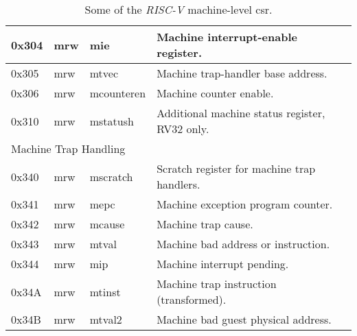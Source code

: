 \begin{table}[!ht]
\begin{tabular}{|llll|}
  \multicolumn{1}{|l|}{0x304}           & \multicolumn{1}{l|}{\acrshort{mrw}}                & \multicolumn{1}{l|}{mie}           & Machine interrupt-enable register.             \\ \hline
  \multicolumn{1}{|l|}{0x305}           & \multicolumn{1}{l|}{\acrshort{mrw}}                & \multicolumn{1}{l|}{mtvec}         & Machine trap-handler base address.             \\ \hline
  \multicolumn{1}{|l|}{0x306}           & \multicolumn{1}{l|}{\acrshort{mrw}}                & \multicolumn{1}{l|}{mcounteren}    & Machine counter enable.                        \\ \hline
  \multicolumn{1}{|l|}{0x310}           & \multicolumn{1}{l|}{\acrshort{mrw}}                & \multicolumn{1}{l|}{mstatush}      & Additional machine status register, RV32 only. \\ \hline
  \multicolumn{4}{|l|}{Machine Trap Handling}                                                                                                                           \\ \hline
  \multicolumn{1}{|l|}{0x340}           & \multicolumn{1}{l|}{\acrshort{mrw}}                & \multicolumn{1}{l|}{mscratch}      & Scratch register for machine trap handlers.    \\ \hline
  \multicolumn{1}{|l|}{0x341}           & \multicolumn{1}{l|}{\acrshort{mrw}}                & \multicolumn{1}{l|}{mepc}          & Machine exception program counter.             \\ \hline
  \multicolumn{1}{|l|}{0x342}           & \multicolumn{1}{l|}{\acrshort{mrw}}                & \multicolumn{1}{l|}{mcause}        & Machine trap cause.                            \\ \hline
  \multicolumn{1}{|l|}{0x343}           & \multicolumn{1}{l|}{\acrshort{mrw}}                & \multicolumn{1}{l|}{mtval}         & Machine bad address or instruction.            \\ \hline
  \multicolumn{1}{|l|}{0x344}           & \multicolumn{1}{l|}{\acrshort{mrw}}                & \multicolumn{1}{l|}{mip}           & Machine interrupt pending.                     \\ \hline
  \multicolumn{1}{|l|}{0x34A}           & \multicolumn{1}{l|}{\acrshort{mrw}}                & \multicolumn{1}{l|}{mtinst}        & Machine trap instruction (transformed).        \\ \hline
  \multicolumn{1}{|l|}{0x34B}           & \multicolumn{1}{l|}{\acrshort{mrw}}                & \multicolumn{1}{l|}{mtval2}        & Machine bad guest physical address.            \\ \hline
  \end{tabular}
  \caption{Some of the \textit{RISC-V} machine-level \acrshort{csr}.}
  \label{tab:machine_csr}
\end{table}

